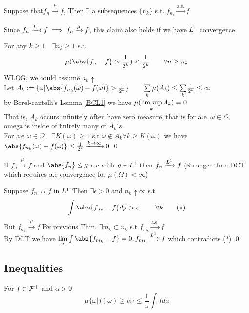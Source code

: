 \newpage
\begin{thm}
Suppose that$f_n \xrightarrow{\mu}f$, Then $\exists$ a subsequences $\{n_k\}$ s.t. $f_{n_k} \xrightarrow{\text{a.e.}}f$	 
\end{thm}
\begin{rem}
Since $f_n \xrightarrow{L^{1}}f \implies f_n \xrightarrow{\mu}f$, this claim also holds if we have $L^{1}$ convergence.
\end{rem}
\pf For any $k\geq 1 \quad \exists n_k \geq 1$ s.t. 
\begin{equation*}
    \mu(\abs{f_n-f} > \frac{1}{2^k}) < \frac{1}{2^k} \qquad \forall n\geq n_k
\end{equation*}WLOG, we could assume $n_k \uparrow$ \\
Let $A_k := \{\omega| \abs{f_{n_k}(\omega) - f(\omega)}>\frac{1}{2^k}\} \qquad \bigs{k}\mu(A_k) \leq \bigs{k}\frac{1}{2^k} \leq \infty$ \\
by Borel-cantelli's Lemma \ref{BCL1} we have $\mu(\limsup\limits_{k}A_k) = 0$ \\
That is, $A_k$ occurs infinitely often have zero measure, that is for a.e. $\omega \in \Omega$, omega is inside of finitely many of $A_k's$ \\
For a.e $\omega \in \Omega \quad \exists K(\omega) \geq 1$ s.t $\omega \notin A_k \forall k\geq K(\omega)$ we have $\abs{f_{n_k}(\omega)-f(\omega)} \leq \frac{1}{2^k} \xrightarrow{k\rightarrow\infty} 0$
\qed
\begin{thm}
If $f_n \xrightarrow{\mu}f$ and $\abs{f_n}\leq g$ a.e with $g\in L^{1}$ then $f_n \xrightarrow{L^{1}}f$ (Stronger than DCT which requires a.e convergence for $\mu(\Omega) < \infty$)
\end{thm}
\pf Suppose $f_n \nrightarrow f$ in $L^{1}$ Then $\exists \epsilon >0$ and $n_k \uparrow \infty $ s.t
\begin{equation*}
    \int \abs{f_{n_k}-f} d\mu > \epsilon, \qquad \forall k \qquad (*)
\end{equation*}But $f_{n_k} \xrightarrow{\mu}f$ By previous Thm, $\exists m_k\subset n_k$ s.t $f_{m_k} \xrightarrow{\text{a.e.}}f$ \\
By DCT we have $\biglim{n}\int \abs{f_{m_k}-f} = 0, f_{m_k} \xrightarrow{\ls{1}}f$ which contradicts (*)
\qed
\newpage
\subsection{Inequalities}
\begin{thm}\label{markov} For $f\in \mathcal{F}^+$ and $\alpha > 0 $
\begin{equation*}
    \mu\{\omega| f(\omega) \geq \alpha\} \leq \frac{1}{\alpha}\int fd\mu
\end{equation*}
\end{thm}

